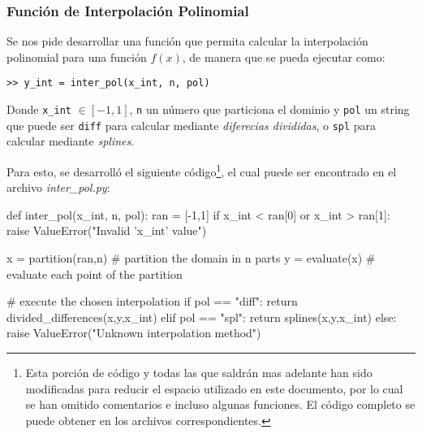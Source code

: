 \documentclass[12pt,letterpaper]{article}
\begin{document}
\subsubsection{Función de Interpolación Polinomial}
Se nos pide desarrollar una función que permita calcular la interpolación polinomial para una función $f(x)$, de manera que se pueda ejecutar como:
\begin{center}
\verb+>> y_int = inter_pol(x_int, n, pol)+
\end{center}

Donde \verb+x_int+ $\in [-1,1]$, \verb+n+ un número que particiona el dominio y \verb+pol+ un string que puede ser \verb+diff+ para calcular mediante \textit{diferecias divididas}, o \verb+spl+ para calcular mediante \textit{splines}.

Para esto, se desarrolló el siguiente código\footnote{Esta porción de código y todas las que saldrán mas adelante han sido modificadas para reducir el espacio utilizado en este documento, por lo cual se han omitido comentarios e incluso algunas funciones. El código completo se puede obtener en los archivos correspondientes.}, el cual puede ser encontrado en el archivo \textit{inter\_pol.py}:
\begin{verbatimtab}[4]
def inter_pol(x_int, n, pol):
	ran = [-1,1]
	if x_int < ran[0] or x_int > ran[1]:
		raise ValueError("Invalid 'x_int' value")
	
	x = partition(ran,n) # partition the domain in n parts
	y = evaluate(x) # evaluate each point of the partition
	
	# execute the chosen interpolation
	if pol == "diff":
		return divided_differences(x,y,x_int)
	elif pol == "spl":
		return splines(x,y,x_int)
	else:
		raise ValueError("Unknown interpolation method")
\end{verbatimtab}
\end{document}

